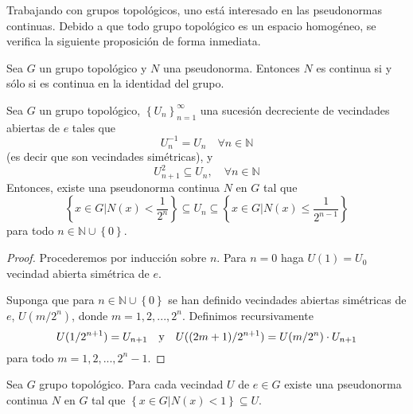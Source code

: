 \documentclass[12pt]{report}
\theoremstyle{largebreak}
\begin{document}
    Trabajando con grupos topológicos, uno está interesado en las pseudonormas continuas. Debido a que todo grupo topológico es un espacio homogéneo, se verifica la siguiente proposición de forma inmediata.

    \begin{propo}
        Sea $G$ un grupo topológico y $N$ una pseudonorma. Entonces $N$ es continua si y sólo si es continua en la identidad del grupo.
    \end{propo}



    \begin{theor}
        Sea $G$ un grupo topológico, $\left\{U_n\right\}_{ n=1}^\infty$ una sucesión decreciente de vecindades abiertas de $e$ tales que
        \begin{equation*}
            U_n^{-1}=U_n\quad\forall n\in\mathbb{N}
        \end{equation*}
        (es decir que son vecindades simétricas), y
        \begin{equation*}
            U_{ n+1}^2\subseteq U_n,\quad\forall n\in\mathbb{N}
        \end{equation*}
        Entonces, existe una pseudonorma continua $N$ en $G$ tal que
        \begin{equation*}
            \left\{x\in G\Big|N(x)<\frac{1}{2^n} \right\}\subseteq U_n\subseteq\left\{x\in G\Big|N(x)\leq\frac{1}{2^{n-1}} \right\}
        \end{equation*}
        para todo $n\in\mathbb{N}\cup\left\{0\right\}$.
    \end{theor}

    \begin{proof}
        Procederemos por inducción sobre $n$. Para $n=0$ haga $U(1)=U_0$ vecindad abierta simétrica de $e$.

        Suponga que para $n\in\mathbb{N}\cup\left\{0\right\}$ se han definido vecindades abiertas simétricas de $e$, $U(m/2^n)$, donde $m=1,2,...,2^n$. Definimos recursivamente
        \begin{equation*}
            U(1/2^{ n+1})=U_{ n+1}\quad\textup{y}\quad U((2m+1)/2^{ n+1})=U(m/2^n)\cdot U_{ n+1}
        \end{equation*}
        para todo $m=1,2,...,2^n-1$.
    \end{proof}

    \begin{cor}
        Sea $G$ grupo topológico. Para cada vecindad $U$ de $e\in G$ existe una pseudonorma continua $N$ en $G$ tal que $\left\{x\in G\Big|N(x)<1 \right\}\subseteq U$. 
    \end{cor}
\end{document}
